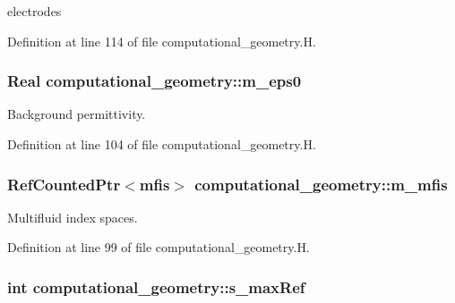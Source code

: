 electrodes 



Definition at line 114 of file computational\+\_\+geometry.\+H.

\subsubsection[{\texorpdfstring{m\+\_\+eps0}{m_eps0}}]{\setlength{\rightskip}{0pt plus 5cm}Real computational\+\_\+geometry\+::m\+\_\+eps0\hspace{0.3cm}{\ttfamily [protected]}}\hypertarget{classcomputational__geometry_a4825cf47fffc4aaabfbfd8892df93838}{}\label{classcomputational__geometry_a4825cf47fffc4aaabfbfd8892df93838}


Background permittivity. 



Definition at line 104 of file computational\+\_\+geometry.\+H.

\subsubsection[{\texorpdfstring{m\+\_\+mfis}{m_mfis}}]{\setlength{\rightskip}{0pt plus 5cm}Ref\+Counted\+Ptr$<${\bf mfis}$>$ computational\+\_\+geometry\+::m\+\_\+mfis\hspace{0.3cm}{\ttfamily [protected]}}\hypertarget{classcomputational__geometry_a5c1f89c6e4bb2d10a0cf066a76a1928e}{}\label{classcomputational__geometry_a5c1f89c6e4bb2d10a0cf066a76a1928e}


Multifluid index spaces. 



Definition at line 99 of file computational\+\_\+geometry.\+H.

\subsubsection[{\texorpdfstring{s\+\_\+max\+Ref}{s_maxRef}}]{\setlength{\rightskip}{0pt plus 5cm}int computational\+\_\+geometry\+::s\+\_\+max\+Ref\hspace{0.3cm}{\ttfamily [static]}}\hypertarget{classcomputational__geometry_a0ed00181b6659ac3ac5cfa7e8607977a}{}\label{classcomputational__geometry_a0ed00181b6659ac3ac5cfa7e8607977a}



